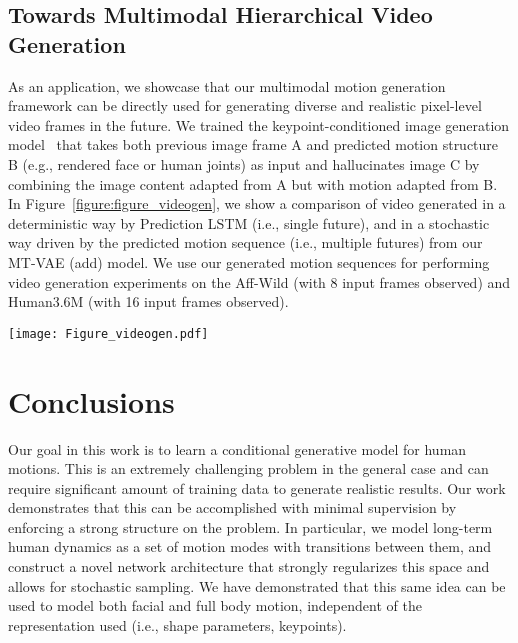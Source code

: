 \documentclass[runningheads]{llncs}
\newcommand{\cutsectionup}{\vspace*{-0.2in}}
\newcommand{\cutsectiondown}{\vspace*{-0.12in}}
\newcommand{\cutsubsectionup}{\vspace*{-0.1in}}
\newcommand{\cutsubsectiondown}{\vspace*{-0.07in}}
\begin{document}
\cutsubsectionup
\subsection{Towards Multimodal Hierarchical Video Generation}
\cutsubsectiondown

As an application, we showcase that our multimodal motion generation framework can be directly used for generating diverse and realistic pixel-level video frames in the future.
We trained the keypoint-conditioned image generation model~\cite{villegas2017learning} that takes both previous image frame A and predicted motion structure B (e.g., rendered face or human joints) as input and hallucinates image C by combining the image content adapted from A but with motion adapted from B.
In Figure~\ref{figure:figure_videogen}, we show a comparison of video generated in a deterministic way by Prediction LSTM (i.e., single future), and in a stochastic way driven by the predicted motion sequence (i.e., multiple futures) from our MT-VAE (add) model.
We use our generated motion sequences for performing video generation experiments on the Aff-Wild (with 8 input frames observed) and Human3.6M (with 16 input frames observed).


\begin{figure*}[t]
\centering
\texttt{[image: Figure\_videogen.pdf]}
\caption{Multimodal Hierarchical video generation. Top rows: Face video generation results from 8 observed frames.
Bottom rows: Human video generation results from 16 observed frames.
}
\label{figure:figure_videogen}
\vspace*{-0.2in}
\end{figure*}

\cutsectionup
\section{Conclusions}
\cutsectiondown

Our goal in this work is to learn a conditional generative model for human motions. 
This is an extremely challenging problem in the general case and can require significant amount of training data to generate realistic results.
Our work demonstrates that this can be accomplished with minimal supervision by enforcing a strong structure on the problem.
In particular, we model long-term human dynamics as a set of motion modes with transitions between them, and construct a novel network architecture that strongly regularizes this space and allows for stochastic sampling.
We have demonstrated that this same idea can be used to model both facial and full body motion, independent of the representation used (i.e., shape parameters, keypoints).
\end{document}
